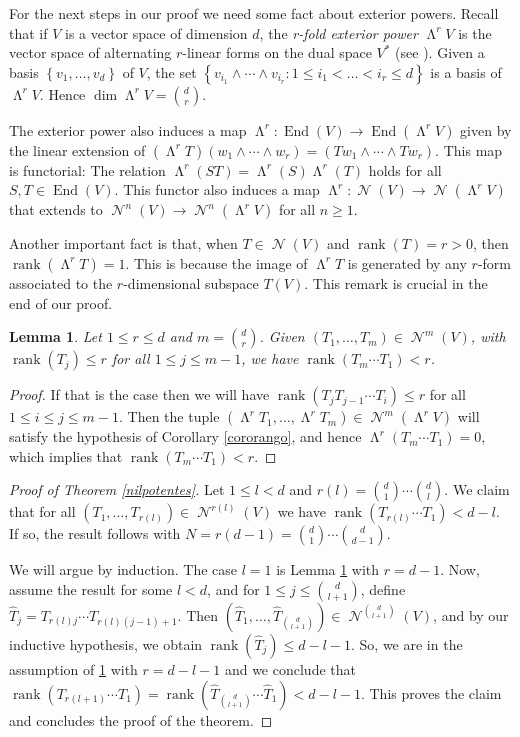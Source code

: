 \documentclass[JEP,XML,SOM,Unicode,NoEqCountersInSection]{cedram}
\let\mathcal\mathscr
\theoremstyle{plain}
\newtheorem{lema}[teo]{Lemma}
\theoremstyle{definition}
\newcommand{\corchete}[1]{\left\{{#1}\right\}}
\DeclareMathOperator{\End}{End}
\DeclareMathOperator{\Nil}{\mathcal{N}}
\DeclareMathOperator{\rank}{rank}
\DeclareMathOperator{\Wedge}{\mathsf{\Lambda}}
\begin{document}
For the next steps in our proof we need some fact about exterior powers. Recall that if $V$ is a vector space of dimension $d$, the \textit{r-fold exterior power} $\Wedge^{r}{V}$ is the vector space of alternating $r$-linear forms on the dual space $V^*$ (see \eg \cite[XIX.1]{langalg}). Given a basis $\corchete{v_1,\dots, v_d}$ of $V$, the set
$\corchete{v_{i_1}\wedge \cdots \wedge v_{i_r} : 1\leq i_1<\dots <i_r\leq d}$ is a basis of $\Wedge^{r}{V}$. Hence $\dim {\Wedge^{r}V}=\binom{d}{r}$.

The exterior power also induces a map $\Wedge^{r}: \End(V) \rightarrow \End(\Wedge^{r}{V})$ given by the linear extension of $(\Wedge^{r}T)(w_1\wedge \cdots \wedge w_r)=(Tw_1\wedge \cdots \wedge Tw_r)$. This map is functorial: The relation $\Wedge^{r}(ST)=\Wedge^{r}(S)\Wedge^{r}(T)$ holds for all $S,T \in \End(V)$. This functor also induces a map $\Wedge^{r}: \Nil(V)\rightarrow \Nil(\Wedge^{r}{V})$ that extends to $\Nil^{n}(V)\rightarrow \Nil^{n}(\Wedge^{r}{V})$ for all $n\geq 1$.

Another important fact is that, when $T\in \Nil(V)$ and $\rank(T)=r>0$, then $\rank(\Wedge^{r}{T})=1$. This is because the image of $\Wedge^{r}{T}$ is generated by any $r$-form associated to the $r$-dimensional subspace $T(V)$. This remark is crucial in the end of our proof.

\begin{lema}\label{lemaa}
Let $1\leq r\leq d$ and $m=\binom{d}{r}$. Given $(T_1,\dots,T_m)\in \Nil^{m}(V)$, with $\rank(T_j) \leq r$ for all $1\leq j\leq m-1$, we have $\rank(T_{m}\cdots T_{1})<r$.
\end{lema}
\begin{proof}
If that is the case then we will have $\rank(T_{j}T_{j-1}\cdots T_{i})\leq r$ for all $1\leq i\leq j\leq m-1$. Then the tuple $(\Wedge^{r}{T_1},\dots,\Wedge^{r}{T_m})\in \Nil^{m}(\Wedge^{r}{V})$ will satisfy the hypothesis of Corollary \ref{cororango}, and hence $\Wedge^{r}(T_m\cdots T_1)=0$, which implies that \hbox{$\rank(T_m\cdots T_1 )<r$}.
\end{proof}

\begin{proof}[Proof of Theorem \ref{nilpotentes}]
Let $1\leq l< d$ and $r(l)= \binom{d}{1}\cdots \binom{d}{l}$. We claim that for all $(T_1,\dots,T_{r(l)})\in \Nil^{r(l)}(V)$ we have $\rank(T_{r(l)} \cdots T_{1})<d-l$. If so, the result follows with $N=r(d-1)=\binom{d}{1}\cdots \binom{d}{d-1}$.

We will argue by induction. The case $l=1$ is Lemma \ref{lemaa} with $r=d-1$. Now, assume the result for some $l<d$, and for $1\leq j \leq \binom{d}{l+1}$, define $\hat{T}_j=T_{r(l)j}\cdots T_{r(l)(j-1)+1}$. Then $(\hat{T}_1,\dots,\hat{T}_{\binom{d}{l+1}})\in \Nil^{\binom{d}{l+1}}(V)$, and by our inductive hypothesis, we obtain $\rank(\hat{T}_j)\leq d-l-1$. So, we are in the assumption of \ref{lemaa} with $r=d-l-1$ and we conclude that $\rank(T_{r(l+1)}\cdots T_{1})=\rank(\hat{T}_{\binom{d}{l+1}}\cdots \hat{T}_{1})<d-l-1$. This proves the claim and concludes the proof of the theorem.
\end{proof}
\end{document}
